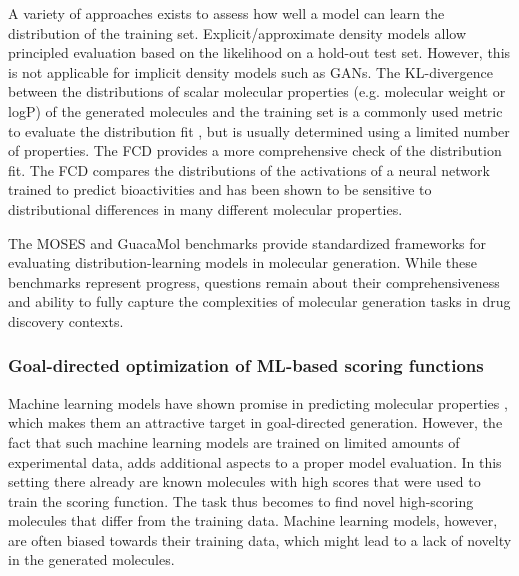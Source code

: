 A variety of approaches exists to assess how well a model can learn the distribution of the training
set. Explicit/approximate density models allow principled evaluation based on the likelihood on a
hold-out test set. However, this is not applicable for implicit density models such as \acp{GAN}.
The KL-divergence between the distributions of scalar molecular properties (e.g. molecular weight or
logP) of the generated molecules and the training set is a commonly used metric to evaluate the
distribution fit \citep{brownGuacaMolBenchmarkingModels2019,polykovskiyMolecularSetsMOSES2020}, but
is usually determined using a limited number of properties. The \ac{FCD}
\citep{preuerFrechetChemNetDistance2018} provides a more comprehensive check of the distribution
fit. The \ac{FCD} compares the distributions of the activations of a neural network trained to
predict bioactivities and has been shown to be sensitive to distributional differences in many
different molecular properties.

The MOSES \citep{polykovskiyMolecularSetsMOSES2020} and GuacaMol
\citep{brownGuacaMolBenchmarkingModels2019} benchmarks provide standardized frameworks for
evaluating distribution-learning models in molecular generation. While these benchmarks represent
progress, questions remain about their comprehensiveness and ability to fully capture the
complexities of molecular generation tasks in drug discovery contexts.

\subsubsection{Goal-directed optimization of ML-based scoring functions}
Machine learning models have shown promise in predicting molecular properties
\citep{mayrDeepToxToxicityPrediction2016,klambauerMachineLearningDrug2019,vamathevanApplicationsMachineLearning2019,chenRiseDeepLearning2018,stokesDeepLearningApproach2020},
which makes them an attractive target in goal-directed generation. However, the fact that such
machine learning models are trained on limited amounts of experimental data, adds additional aspects
to a proper model evaluation. In this setting there already are known molecules with high scores
that were used to train the scoring function. The task thus becomes to find novel
high-scoring molecules that differ from the training data. Machine learning models, however, are
often biased towards their training data, which might lead to a lack of novelty in the generated
molecules.

